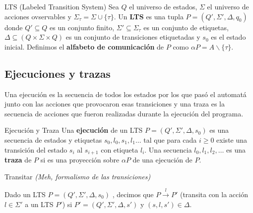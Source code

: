 \begin{definicion}{LTS (Labeled Transition System)}
Sea $Q$ el universo de estados, $\Sigma$ el universo de acciones ovservables y $\Sigma_\tau= \Sigma\cup\{\tau\}$. Un \textbf{LTS} es una tupla $P = (Q', \Sigma', \Delta, q_0)$ donde $Q'\subseteq Q$ es un conjunto finito, $\Sigma'\subseteq \Sigma_\tau$ es un conjunto de etiquetas, $\Delta\subseteq (Q\times \Sigma \times Q )$ es un conjunto de transiciones etiquetadas y $s_0$ es el estado inicial. Definimos el \textbf{alfabeto de comunicación} de $P$ como $\alpha P = A \backslash \{\tau\}$.
\end{definicion}

\subsection{Ejecuciones y trazas}
Una ejecución es la secuencia de todos los estados por los que pasó el automatá junto con las acciones que provocaron esas transiciones y una traza es la secuencia de acciones que fueron realizadas durante la ejecución del programa.

\begin{definicion}{Ejecución y Traza}
Una \textbf{ejecución} de un LTS $P = (Q', \Sigma', \Delta, s_0)$ es una secuencia de estados y etiquetas $s_0,l_0,s_1,l_1\dots$ tal que para cada $i\geq 0$ existe una transición del estado $s_i$ al $s_{i+1}$ con etiqueta $l_i$. Una secuencia $l_0, l_1,l_2,\dots$ es una \textbf{traza} de $P$ si es una proyección sobre $\alpha P$ de una ejecución de $P$.
\end{definicion}

\begin{definicion}{Transitar}
\textit{(Meh, formalismo de las transiciones)}

Dado un LTS $P = (Q', \Sigma', \Delta, s_0)$ , decimos que $P \overset{l}{\rightarrow} P'$ (transita con la acción $l\in\Sigma'$ a un LTS $P'$) si $P' = (Q', \Sigma', \Delta, s')$ y  $(s,l,s') \in \Delta$.
\end{definicion}

